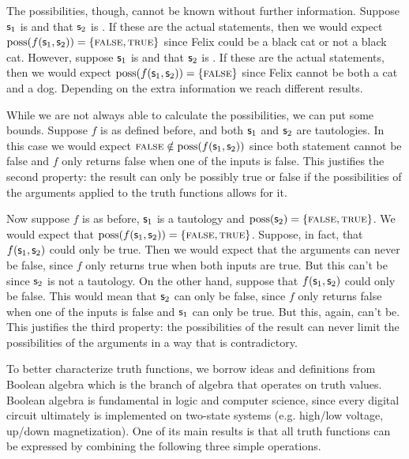 \documentclass[11pt,letterpaper,fleqn]{memoir} %
\begin{document}
\begin{mathSection}
\begin{justification}
		The possibilities, though, cannot be known without further information. Suppose $\mathsf{s}_1$ is  and that $\mathsf{s}_2$ is . If these are the actual statements, then we would expect $\operatorname{poss}(f(\mathsf{s}_1, \mathsf{s}_2)) = \{\textsc{false}, \textsc{true}\}$ since Felix could be a black cat or not a black cat. However, suppose $\mathsf{s}_1$ is  and that $\mathsf{s}_2$ is . If these are the actual statements, then we would expect $\operatorname{poss}(f(\mathsf{s}_1, \mathsf{s}_2)) = \{\textsc{false}\}$ since Felix cannot be both a cat and a dog. Depending on the extra information we reach different results.
		
		While we are not always able to calculate the possibilities, we can put some bounds. Suppose $f$ is as defined before, and both $\mathsf{s}_1$ and $\mathsf{s}_2$ are tautologies. In this case we would expect $\textsc{false} \notin \operatorname{poss}(f(\mathsf{s}_1, \mathsf{s}_2))$ since both statement cannot be false and $f$ only returns false when one of the inputs is false. This justifies the second property: the result can only be possibly true or false if the possibilities of the arguments applied to the truth functions allows for it.
		
		Now suppose $f$ is as before, $\mathsf{s}_1$ is a tautology and $\operatorname{poss}(\mathsf{s}_2) = \{\textsc{false}, \textsc{true}\}$. We would expect that  $\operatorname{poss}(f(\mathsf{s}_1, \mathsf{s}_2)) = \{\textsc{false}, \textsc{true}\}$. Suppose, in fact, that $f(\mathsf{s}_1, \mathsf{s}_2)$ could only be true. Then we would expect that the arguments can never be false, since $f$ only returns true when both inputs are true. But this can't be since $\mathsf{s}_2$ is not a tautology. On the other hand, suppose that $f(\mathsf{s}_1, \mathsf{s}_2)$ could only be false. This would mean that $\mathsf{s}_2$ can only be false, since $f$ only returns false when one of the inputs is false and $\mathsf{s}_1$ can only be true. But this, again, can't be. This justifies the third property: the possibilities of the result can never limit the possibilities of the arguments in a way that is contradictory.	
	\end{justification}
\end{mathSection}

To better characterize truth functions, we borrow ideas and definitions from Boolean algebra which is the branch of algebra that operates on truth values. Boolean algebra is fundamental in logic and computer science, since every digital circuit ultimately is implemented on two-state systems (e.g. high/low voltage, up/down magnetization).  One of its main results is that all truth functions can be expressed by combining the following three simple operations.
\end{document}
